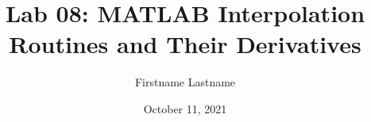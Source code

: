 \newcommand{\course}{MATH 3341}
\title{Lab 08: MATLAB Interpolation Routines and Their Derivatives}
\author{Firstname Lastname}
\date{October 11, 2021}
